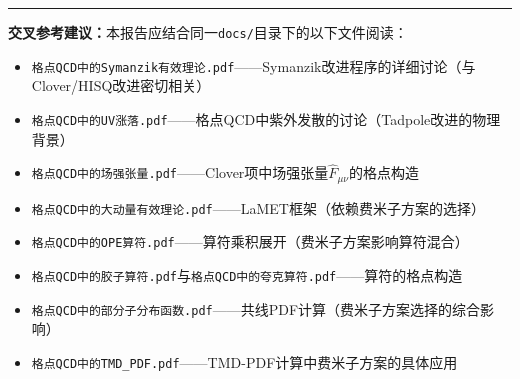 \documentclass[12pt,a4paper]{ctexart}
\theoremstyle{definition}
\begin{document}
\vspace{0.5cm}
\noindent\rule{\textwidth}{0.5pt}
\small
\textbf{交叉参考建议：}本报告应结合同一\texttt{docs/}目录下的以下文件阅读：
\begin{itemize}[nosep]
    \item \texttt{格点QCD中的Symanzik有效理论.pdf}——Symanzik改进程序的详细讨论（与Clover/HISQ改进密切相关）
    \item \texttt{格点QCD中的UV涨落.pdf}——格点QCD中紫外发散的讨论（Tadpole改进的物理背景）
    \item \texttt{格点QCD中的场强张量.pdf}——Clover项中场强张量$\hat F_{\mu\nu}$的格点构造
    \item \texttt{格点QCD中的大动量有效理论.pdf}——LaMET框架（依赖费米子方案的选择）
    \item \texttt{格点QCD中的OPE算符.pdf}——算符乘积展开（费米子方案影响算符混合）
    \item \texttt{格点QCD中的胶子算符.pdf}与\texttt{格点QCD中的夸克算符.pdf}——算符的格点构造
    \item \texttt{格点QCD中的部分子分布函数.pdf}——共线PDF计算（费米子方案选择的综合影响）
    \item \texttt{格点QCD中的TMD\_PDF.pdf}——TMD-PDF计算中费米子方案的具体应用
\end{itemize}
\end{document}
